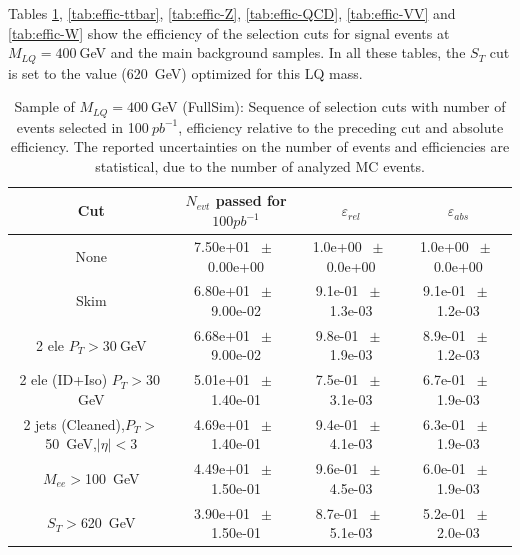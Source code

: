 Tables  
\ref{tab:effic-MLQ400}, 
\ref{tab:effic-ttbar}, 
\ref{tab:effic-Z}, 
\ref{tab:effic-QCD},
\ref{tab:effic-VV} and
\ref{tab:effic-W}
show the efficiency of the selection cuts for signal events at $M_{LQ}=400~$GeV and the main background samples.
In all these tables, the $S_T$ cut is set to the value (620~GeV) optimized for this LQ mass.  

\begin{table}[htbp] 
\begin{center} 
\begin{tabular}{|c|c|c|c|} 
\hline\hline 
 Cut & $N_{evt}$ passed for $100pb^{-1}$ & $\varepsilon_{rel}$ & $\varepsilon_{abs}$ \\ 
\hline\hline 
None       &        7.50e+01       $~\pm~$       0.00e+00        &        1.0e+00       $~\pm~$       0.0e+00        &        1.0e+00       $~\pm~$       0.0e+00       \\       
       Skim       &        6.80e+01       $~\pm~$       9.00e-02        &        9.1e-01       $~\pm~$       1.3e-03        &        9.1e-01       $~\pm~$       1.2e-03       \\       
       2 ele $P_T>30~$GeV       &        6.68e+01       $~\pm~$       9.00e-02        &        9.8e-01       $~\pm~$       1.9e-03        &        8.9e-01       $~\pm~$       1.2e-03       \\       
       2 ele (ID+Iso) $P_T>30~$GeV       &        5.01e+01       $~\pm~$       1.40e-01        &        7.5e-01       $~\pm~$       3.1e-03        &        6.7e-01       $~\pm~$       1.9e-03       \\       
       2 jets (Cleaned),$P_T>$50~GeV,$|\eta|<$3       &        4.69e+01       $~\pm~$       1.40e-01        &        9.4e-01       $~\pm~$       4.1e-03        &        6.3e-01       $~\pm~$       1.9e-03       \\       
       $M_{ee}>$100~GeV       &        4.49e+01       $~\pm~$       1.50e-01        &        9.6e-01       $~\pm~$       4.5e-03        &        6.0e-01       $~\pm~$       1.9e-03       \\       
       $S_T>$620~GeV       &        3.90e+01       $~\pm~$       1.50e-01        &        8.7e-01       $~\pm~$       5.1e-03        &        5.2e-01       $~\pm~$       2.0e-03       \\       
          \hline\hline 
\end{tabular} 
\end{center} 
\caption{Sample of $M_{LQ}=400~$GeV (FullSim): Sequence of selection cuts with number of events selected in 100$~pb^{-1}$, efficiency relative to the preceding cut and absolute efficiency. The reported uncertainties on the number of events and efficiencies are statistical, due to the number of analyzed MC events.} 
\label{tab:effic-MLQ400} 
\end{table} 

